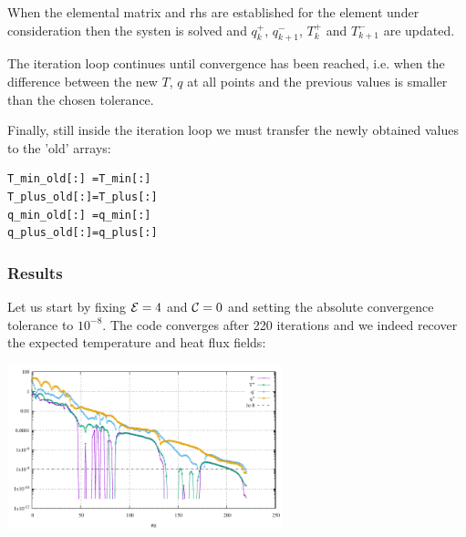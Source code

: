 When the elemental matrix and rhs are established for the element under consideration
then the systen is solved and $q_k^+$, $q_{k+1}^-$, $T_k^+$ and $T_{k+1}^-$ are updated.

The iteration loop continues until convergence has been reached, i.e.
when the difference between the new $T$, $q$ at all points and the previous
values is smaller than the chosen tolerance. 

Finally, still inside the iteration loop we must transfer the newly obtained values to the 
'old' arrays:
\begin{lstlisting}
T_min_old[:] =T_min[:]
T_plus_old[:]=T_plus[:]
q_min_old[:] =q_min[:]
q_plus_old[:]=q_plus[:]
\end{lstlisting}



\subsubsection*{Results}

Let us start by fixing ${\cal E}=4$ and ${\cal C}=0$ and setting the absolute convergence 
tolerance to $10^{-8}$. The code converges after 220 iterations and we indeed recover the 
expected temperature and heat flux fields:

\begin{center}
\includegraphics[width=8cm]{python_codes/fieldstone_57/results/E04_C000/convergence.pdf}
\end{center}

